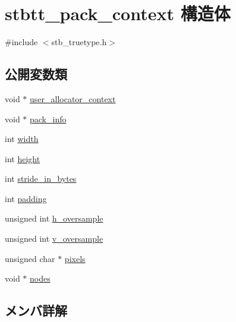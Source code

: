 \hypertarget{structstbtt__pack__context}{}\section{stbtt\+\_\+pack\+\_\+context 構造体}
\label{structstbtt__pack__context}


{\ttfamily \#include $<$stb\+\_\+truetype.\+h$>$}

\subsection*{公開変数類}
\begin{DoxyCompactItemize}
\item 
void $\ast$ \mbox{\hyperlink{structstbtt__pack__context_a45fddc4d4adfcef58aa08ad2874cedc0}{user\+\_\+allocator\+\_\+context}}
\item 
void $\ast$ \mbox{\hyperlink{structstbtt__pack__context_a303a72f0a39479b439fa531925be7031}{pack\+\_\+info}}
\item 
int \mbox{\hyperlink{structstbtt__pack__context_a5da0b7b5d3b82d5fc75ea1c8945183fa}{width}}
\item 
int \mbox{\hyperlink{structstbtt__pack__context_a817ec010d7f09ba9776517c5a87f13a7}{height}}
\item 
int \mbox{\hyperlink{structstbtt__pack__context_abbe9a25aae0e26b81a5f7339fac23801}{stride\+\_\+in\+\_\+bytes}}
\item 
int \mbox{\hyperlink{structstbtt__pack__context_a1191f34fa995910044191584f0d7a803}{padding}}
\item 
unsigned int \mbox{\hyperlink{structstbtt__pack__context_aee1019f9634cad49fa07e8e1f897d6b7}{h\+\_\+oversample}}
\item 
unsigned int \mbox{\hyperlink{structstbtt__pack__context_a4b55efa27ef36e7f258afe92921784c0}{v\+\_\+oversample}}
\item 
unsigned char $\ast$ \mbox{\hyperlink{structstbtt__pack__context_a6549105fd1922df983fbe036b9db4a1a}{pixels}}
\item 
void $\ast$ \mbox{\hyperlink{structstbtt__pack__context_a11a73fa6860e6be1ac039fcca9db2c7c}{nodes}}
\end{DoxyCompactItemize}


\subsection{メンバ詳解}
\mbox{\label{structstbtt__pack__context_aee1019f9634cad49fa07e8e1f897d6b7}} 
